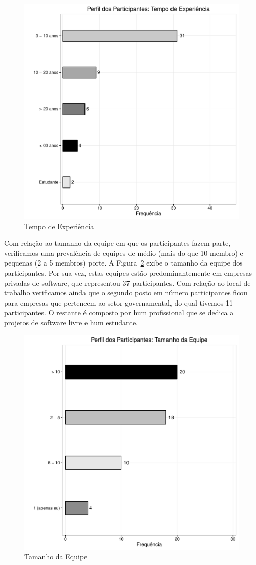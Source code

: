 \begin{figure}[htpb]
	\centering
	\includegraphics[width=0.6\linewidth]{./chapter-estudo-funcionalidades-fgrm/img/grafico_escolha_ferramentas_tempo_experiencia.pdf}
	\caption{Tempo de Experiência}
\label{fig:grafico_escolha_ferramentas_tempo_experiencia}
\end{figure}

Com relação ao tamanho da equipe em que os participantes fazem parte,
verificamos uma prevalência de equipes de médio (mais do que 10 membro) e
pequenas (2 a 5 membros) porte. A
Figura~\ref{fig:grafico_escolha_ferramentas_tamanho_equipe} exibe o tamanho da
equipe dos participantes. Por sua vez, estas equipes estão predominantemente em
empresas privadas de software, que representou 37 participantes. Com relação ao
local de trabalho verificamos ainda que o segundo posto em número
par\-ti\-ci\-pan\-tes ficou para empresas que pertencem ao setor governamental,
do qual tivemos 11 participantes. O restante é composto por hum profissional que
se dedica a projetos de software livre e hum estudante. 

\begin{figure}[htpb]
	\centering
	\includegraphics[width=0.6\linewidth]{./chapter-estudo-funcionalidades-fgrm/img/grafico_escolha_ferramentas_tamanho_equipe.pdf}
	\caption{Tamanho da Equipe}
\label{fig:grafico_escolha_ferramentas_tamanho_equipe}
\end{figure}

